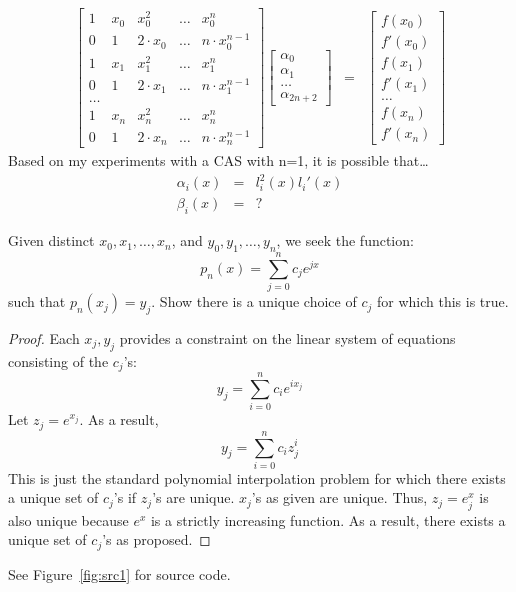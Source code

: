 \documentclass{article}
\newcommand{\ea}[1]{\begin{eqnarray*}#1\end{eqnarray*}}
\begin{document}
\ea{
	\left[ \begin{array}{ccccc} 
			  1 & x_0 & x_0^2 & \dots & x_0^n \\
			  0 & 1   & 2\cdot x_0 & \dots & n\cdot x_0^{n-1} \\
			  1 & x_1 & x_1^2 & \dots & x_1^n \\
			  0 & 1   & 2\cdot x_1 & \dots & n\cdot x_1^{n-1} \\
			  \dots \\
			  1 & x_n & x_n^2 & \dots & x_n^n \\
			  0 &  1  & 2\cdot x_n & \dots & n\cdot x_n^{n-1}
			\end{array}
	\right]
	\left[ \begin{array}{c}
		\alpha_0\\
		\alpha_1\\
		\dots \\
		\alpha_{2n+2}
	\end{array}\right]
	&=& 
	\left[ \begin{array}{c}
		f(x_0) \\
		f'(x_0) \\
		f(x_1) \\
		f'(x_1) \\
		\dots \\
		f(x_n) \\
		f'(x_n) 
	\end{array}\right]
}
Based on my experiments with a CAS with n=1, it is possible that\dots\\
\ea{
\alpha_i(x) &=& l_i^2(x)l_i'(x) \\
	\beta_i(x) &=& ?
}

 Given distinct $x_0,x_1,\dots,x_n$, and $y_0,y_1,\dots,y_n$, we seek the function:
	\[
		p_n(x) = \sum_{j=0}^n c_je^{jx}
	\]
	such that $p_n(x_j)=y_j$. Show there is a unique choice of $c_j$ for which this is true.
\begin{proof}
Each $x_j,y_j$ provides a constraint on the linear system of equations consisting of the $c_j$'s:
\[
	y_j = \sum_{i=0}^n c_i e^{ix_j}
\]
Let $z_j=e^{x_j}$.  As a result,
\[
	y_j = \sum_{i=0}^n c_i z_j^i
\]
This is just the standard polynomial interpolation problem for which there exists a unique set of
$c_j$'s if $z_j$'s are unique.  $x_j$'s as given are unique. Thus, $z_j=e^x_j$ is also unique because $e^x$ is 
a strictly increasing function.  As a result, there exists a unique set of $c_j$'s as proposed.
\end{proof}
See Figure~\ref{fig:src1} for source code.
\end{document}
